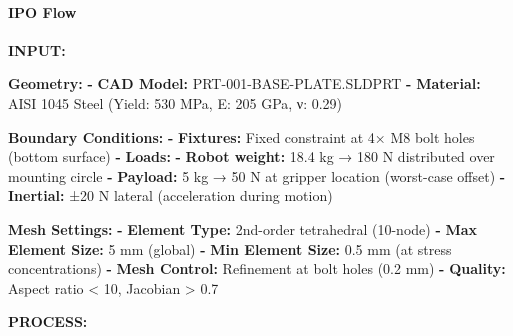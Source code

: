\documentclass[
]{article}
\newenvironment{Shaded}{\begin{snugshade}}{\end{snugshade}}
\newcommand{\AttributeTok}[1]{\textcolor[rgb]{0.13,0.29,0.53}{#1}}
\newcommand{\FunctionTok}[1]{\textcolor[rgb]{0.13,0.29,0.53}{\textbf{#1}}}
\newcommand{\KeywordTok}[1]{\textcolor[rgb]{0.13,0.29,0.53}{\textbf{#1}}}
\begin{document}
\hypertarget{ipo-flow}{%
\paragraph{IPO Flow}\label{ipo-flow}}

\textbf{INPUT:}

\begin{Shaded}
\begin{Highlighting}[]
\FunctionTok{Geometry}\KeywordTok{:}
\AttributeTok{  }\KeywordTok{{-}}\AttributeTok{ }\FunctionTok{CAD Model}\KeywordTok{:}\AttributeTok{ PRT{-}001{-}BASE{-}PLATE.SLDPRT}
\AttributeTok{  }\KeywordTok{{-}}\AttributeTok{ }\FunctionTok{Material}\KeywordTok{:}\AttributeTok{ AISI 1045 Steel (Yield: 530 MPa, E: 205 GPa, ν: 0.29)}

\FunctionTok{Boundary Conditions}\KeywordTok{:}
\AttributeTok{  }\KeywordTok{{-}}\AttributeTok{ }\FunctionTok{Fixtures}\KeywordTok{:}\AttributeTok{ Fixed constraint at 4× M8 bolt holes (bottom surface)}
\AttributeTok{  }\KeywordTok{{-}}\AttributeTok{ }\FunctionTok{Loads}\KeywordTok{:}
\AttributeTok{      }\KeywordTok{{-}}\AttributeTok{ }\FunctionTok{Robot weight}\KeywordTok{:}\AttributeTok{ 18.4 kg → 180 N distributed over mounting circle}
\AttributeTok{      }\KeywordTok{{-}}\AttributeTok{ }\FunctionTok{Payload}\KeywordTok{:}\AttributeTok{ 5 kg → 50 N at gripper location (worst{-}case offset)}
\AttributeTok{      }\KeywordTok{{-}}\AttributeTok{ }\FunctionTok{Inertial}\KeywordTok{:}\AttributeTok{ ±20 N lateral (acceleration during motion)}

\FunctionTok{Mesh Settings}\KeywordTok{:}
\AttributeTok{  }\KeywordTok{{-}}\AttributeTok{ }\FunctionTok{Element Type}\KeywordTok{:}\AttributeTok{ 2nd{-}order tetrahedral (10{-}node)}
\AttributeTok{  }\KeywordTok{{-}}\AttributeTok{ }\FunctionTok{Max Element Size}\KeywordTok{:}\AttributeTok{ 5 mm (global)}
\AttributeTok{  }\KeywordTok{{-}}\AttributeTok{ }\FunctionTok{Min Element Size}\KeywordTok{:}\AttributeTok{ 0.5 mm (at stress concentrations)}
\AttributeTok{  }\KeywordTok{{-}}\AttributeTok{ }\FunctionTok{Mesh Control}\KeywordTok{:}\AttributeTok{ Refinement at bolt holes (0.2 mm)}
\AttributeTok{  }\KeywordTok{{-}}\AttributeTok{ }\FunctionTok{Quality}\KeywordTok{:}\AttributeTok{ Aspect ratio \textless{} 10, Jacobian \textgreater{} 0.7}
\end{Highlighting}
\end{Shaded}

\textbf{PROCESS:}
\end{document}
